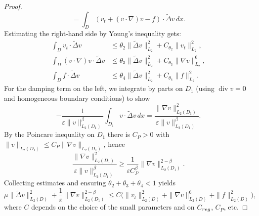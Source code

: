 \documentclass[10pt,a4paper]{amsart}
\begin{document}
\begin{proof}
\[	= \int_D (v_t+(v\cdot\nabla)v-f)\cdot\tilde\Delta v\,dx.
	\]
	Estimating the right-hand side by Young's inequality gets:
	\[
	\begin{aligned}
		\int_D v_t\cdot\tilde\Delta v &\le \theta_2\|\tilde\Delta v\|_{L_2}^2 + C_{\theta_2}\|v_t\|_{L_2}^2,\\
		\int_D (v\cdot\nabla)v\cdot\tilde\Delta v &\le \theta_3\|\tilde\Delta v\|_{L_2}^2 + C_{\theta_3}\|\nabla v\|_{L_2}^6,\\
		\int_D f\cdot\tilde\Delta v &\le \theta_4\|\tilde\Delta v\|_{L_2}^2 + C_{\theta_4}\|f\|_{L_2}^2.
	\end{aligned}
	\]
	For the damping term on the left, we integrate by parts on $D_1$ (using $\operatorname{div}v=0$ and homogeneous boundary conditions) to show
	\[
	-\frac{1}{\varepsilon\|v\|_{L_2(D_1)}^\beta}\int_{D_1} v\cdot\tilde\Delta v\,dx
	= \frac{\|\nabla v\|_{L_2(D_1)}^2}{\varepsilon\|v\|_{L_2(D_1)}^\beta}.
	\]
	By the Poincare inequality on $D_1$ there is $C_P>0$ with $\|v\|_{L_2(D_1)}\le C_P\|\nabla v\|_{L_2(D_1)}$, hence
	\[
	\frac{\|\nabla v\|_{L_2(D_1)}^2}{\varepsilon\|v\|_{L_2(D_1)}^\beta}
	\ge \frac{1}{\varepsilon C_P^\beta}\|\nabla v\|_{L_2(D_1)}^{2-\beta}.
	\]
	Collecting estimates and ensuring $\theta_2+\theta_3+\theta_4<1$ yields
	\begin{equation}\label{St 19}
		{\mu}\|\tilde\Delta v\|_{L_2(D)}^2 + \frac{1}{\varepsilon}\|\nabla v\|_{L_2(D_1)}^{2-\beta}
		\le C\big(\|v_t\|_{L_2(D)}^2 + \|\nabla v\|_{L_2(D)}^6 + \|f\|_{L_2(D)}^2\big),
	\end{equation}
	where $C$ depends on the choice of the small parameters and on $C_{\rm reg}$, $C_P$, etc.
	

\end{proof}
\end{document}
